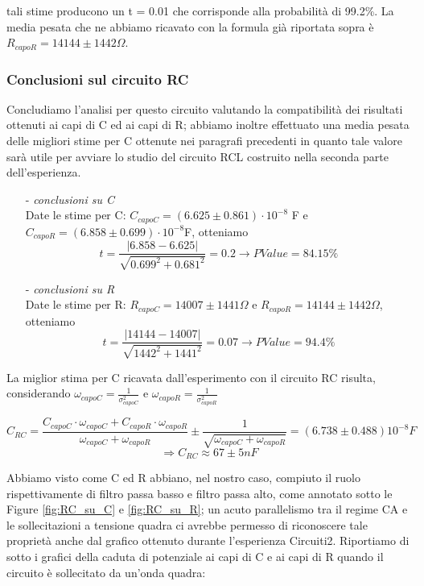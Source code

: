 \documentclass{article}
\theoremstyle{definition}
\begin{document}
\noindent tali stime producono un t = 0.01 che corrisponde alla probabilità di 99.2\%. La media pesata che ne abbiamo ricavato con la formula già riportata sopra è \(R_{capoR} =  14144 \pm 1442  \Omega\).

\subsubsection{Conclusioni sul circuito RC}
Concludiamo l'analisi per questo circuito valutando la compatibilità dei risultati ottenuti ai capi di C ed ai capi di R; abbiamo inoltre effettuato una media pesata delle migliori stime per C ottenute nei paragrafi precedenti in quanto tale valore sarà utile per avviare lo studio del circuito RCL costruito nella seconda parte dell'esperienza.
\begin{enumerate}
    \item[-] \textit{conclusioni su C}\\
    \noindent Date le stime per C: \(C_{capoC} = (6.625 \pm 0.861) \cdot 10^{-8} \) F e \(C_{capoR} = (6.858 \pm 0.699) \cdot 10^{-8} \)F, otteniamo
    \[t = \frac{\left| 6.858 - 6.625\right|}{\sqrt{0.699^{2} + 0.681^{2}}} = 0.2\rightarrow PValue = 84.15\%\]
    \item[-] \textit{conclusioni su R}\\
    \noindent Date le stime per R: \(R_{capoC} = 14007 \pm 1441 \Omega \) e \(R_{capoR} = 14144 \pm 1442 \Omega\), otteniamo
    \[t = \frac{\left| 14144 - 14007 \right|}{\sqrt{1442^{2} + 1441^{2}}} =0.07 \rightarrow PValue = 94.4\%\]
\end{enumerate}

\noindent La miglior stima per C ricavata dall'esperimento con il circuito RC risulta, considerando \(\omega_{capoC} = \frac{1}{\sigma^{2}_{capoC}}\) e \(\omega_{capoR} = \frac{1}{\sigma^{2}_{capoR}}\)

\[C_{RC} = \frac{C_{capoC} \cdot \omega_{capoC} + C_{capoR} \cdot \omega_{capoR}}{\omega_{capoC} + \omega_{capoR}} \pm \frac{1}{\sqrt{\omega_{capoC} + \omega_{capoR}}} = (6.738\pm 0.488) 10^{-8} F\]
\[\Rightarrow C_{RC} \approx 67 \pm 5  nF\]

\pagebreak
\noindent Abbiamo visto come C ed R abbiano, nel nostro caso, compiuto il ruolo rispettivamente di filtro passa basso e filtro passa alto, come annotato sotto le Figure \ref{fig:RC_su_C} e \ref{fig:RC_su_R}; un acuto parallelismo tra il regime CA e le sollecitazioni a tensione quadra ci avrebbe permesso di riconoscere tale proprietà anche dal grafico ottenuto durante l'esperienza Circuiti2. Riportiamo di sotto i grafici della caduta di potenziale ai capi di C e ai capi di R quando il circuito è sollecitato da un'onda quadra:
\end{document}
